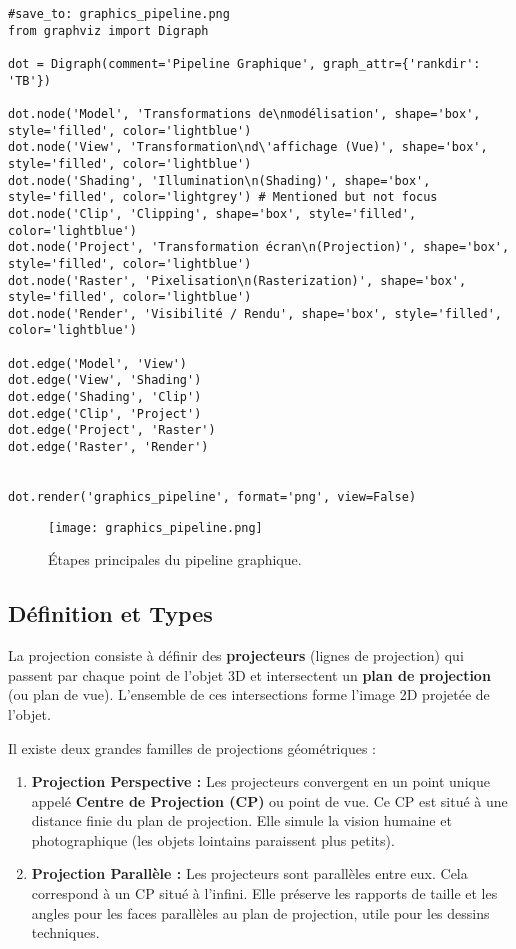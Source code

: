 \documentclass{article}
\begin{document}
\begin{verbatim}
#save_to: graphics_pipeline.png
from graphviz import Digraph

dot = Digraph(comment='Pipeline Graphique', graph_attr={'rankdir': 'TB'})

dot.node('Model', 'Transformations de\nmodélisation', shape='box', style='filled', color='lightblue')
dot.node('View', 'Transformation\nd\'affichage (Vue)', shape='box', style='filled', color='lightblue')
dot.node('Shading', 'Illumination\n(Shading)', shape='box', style='filled', color='lightgrey') # Mentioned but not focus
dot.node('Clip', 'Clipping', shape='box', style='filled', color='lightblue')
dot.node('Project', 'Transformation écran\n(Projection)', shape='box', style='filled', color='lightblue')
dot.node('Raster', 'Pixelisation\n(Rasterization)', shape='box', style='filled', color='lightblue')
dot.node('Render', 'Visibilité / Rendu', shape='box', style='filled', color='lightblue')

dot.edge('Model', 'View')
dot.edge('View', 'Shading')
dot.edge('Shading', 'Clip')
dot.edge('Clip', 'Project')
dot.edge('Project', 'Raster')
dot.edge('Raster', 'Render')


dot.render('graphics_pipeline', format='png', view=False)
\end{verbatim}

\begin{figure}[H]
\centering
\texttt{[image: graphics\_pipeline.png]}
\caption{Étapes principales du pipeline graphique.}
\label{fig:graphics_pipeline}
\end{figure}

\subsection{Définition et Types}
La projection consiste à définir des \textbf{projecteurs} (lignes de projection) qui passent par chaque point de l'objet 3D et intersectent un \textbf{plan de projection} (ou plan de vue). L'ensemble de ces intersections forme l'image 2D projetée de l'objet.

Il existe deux grandes familles de projections géométriques :
\begin{enumerate}
    \item \textbf{Projection Perspective :} Les projecteurs convergent en un point unique appelé \textbf{Centre de Projection (CP)} ou point de vue. Ce CP est situé à une distance finie du plan de projection. Elle simule la vision humaine et photographique (les objets lointains paraissent plus petits).
    \item \textbf{Projection Parallèle :} Les projecteurs sont parallèles entre eux. Cela correspond à un CP situé à l'infini. Elle préserve les rapports de taille et les angles pour les faces parallèles au plan de projection, utile pour les dessins techniques.
\end{enumerate}
\end{document}
